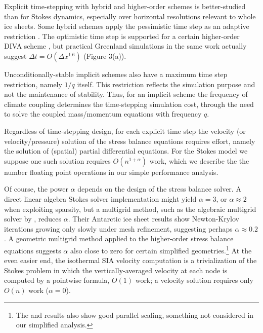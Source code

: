\documentclass[twocolumn,letterpaper]{igs}
\begin{document}
Explicit time-stepping with hybrid and higher-order schemes is better-studied than for Stokes dynamics, especially over horizontal resolutions relevant to whole ice sheets.  Some hybrid schemes apply the pessimistic time step as an adaptive restriction \citep{Winkelmannetal2011}.  The optimistic time step is supported for a certain higher-order DIVA scheme \citep[see equation (52)]{Robinsonetal2022}, but practical Greenland simulations in the same work actually suggest $\Delta t = O(\Delta x^{1.6})$ (Figure 3(a)).

Unconditionally-stable implicit schemes also have a maximum time step restriction, namely $1/q$ itself.  This restriction reflects the simulation purpose and not the maintenance of stability.  Thus, for an implicit scheme the frequency of climate coupling determines the time-stepping simulation cost, through the need to solve the coupled mass/momentum equations with frequency $q$.

Regardless of time-stepping design, for each explicit time step the velocity (or velocity/pressure) solution of the stress balance equations requires effort, namely the solution of (spatial) partial differential equations.  For the Stokes model we suppose one such solution requires $O(n^{1+\alpha})$ work, which we describe the the number floating point operations in our simple performance analysis.

Of course, the power $\alpha$ depends on the design of the stress balance solver.  A direct linear algebra Stokes solver implementation might yield $\alpha=3$, or $\alpha \approx 2$ when exploiting sparsity, but a multigrid method, such as the algebraic multigrid \citep{Trottenbergetal2001} solver by \cite{IsaacStadlerGhattas2015}, reduces $\alpha$.  Their Antarctic ice sheet results show Newton-Krylov iterations \citep{Bueler2021} growing only slowly under mesh refinement, suggesting perhaps $\alpha\approx 0.2$ \citep[see Table 8.1]{IsaacStadlerGhattas2015}.
A geometric multigrid method applied to the higher-order stress balance equations \citep{BrownSmithAhmadia2013} suggests $\alpha$ also close to zero for certain simplified geometries.\footnote{The \cite{IsaacStadlerGhattas2015} and \cite{BrownSmithAhmadia2013} results also show good parallel scaling, something not considered in our simplified analysis.}  At the even easier end, the isothermal SIA velocity computation is a trivialization of the Stokes problem in which the vertically-averaged velocity at each node is computed by a pointwise formula, $O(1)$ work; a velocity solution requires only $O(n)$ work ($\alpha=0$).
\end{document}
